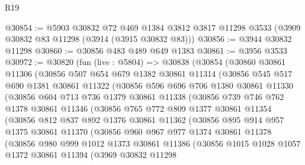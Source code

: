 \begin{lexlean}{R19}
\begin{coremodule}
@30854 := @5903
    @30832
    @72
    @469
    @1384
    @3812
    @3817
    @11298
    @3533
    (@3909 @30832 @83 @11298 (@3914 (@3915 @30832 @83)))
@30856 := @3944 @30832 @11298
@30860 := @30856 @483 @489 @649 @1383
@30861 := @3956 @3533
@30972 := @30820
    (fun (live : @5804) =>
    @30838
      (@30854
        (@30860
          @30861
          @11306
          (@30856
            @507
            @654
            @679
            @1382
            @30861
            @11314
            (@30856
              @545
              @517
              @690
              @1381
              @30861
              @11322
              (@30856
                @596
                @696
                @706
                @1380
                @30861
                @11330
                (@30856
                  @604
                  @713
                  @736
                  @1379
                  @30861
                  @11338
                  (@30856
                    @739
                    @746
                    @762
                    @1378
                    @30861
                    @11346
                    (@30856
                      @765
                      @772
                      @809
                      @1377
                      @30861
                      @11354
                      (@30856
                        @812
                        @837
                        @892
                        @1376
                        @30861
                        @11362
                        (@30856
                          @895
                          @914
                          @957
                          @1375
                          @30861
                          @11370
                          (@30856
                            @960
                            @967
                            @977
                            @1374
                            @30861
                            @11378
                            (@30856
                              @980
                              @999
                              @1012
                              @1373
                              @30861
                              @11386
                              (@30856
                                @1015
                                @1028
                                @1057
                                @1372
                                @30861
                                @11394
                                (@3969
                                  @30832
                                  @11298

\end{coremodule}
\end{lexlean}
